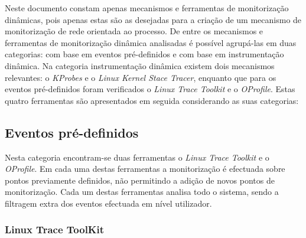 Neste documento constam apenas mecanismos e ferramentas de monitorização dinâmicas, pois apenas estas são as desejadas para a criação de um mecanismo de monitorização de rede orientada ao processo.
De entre os mecanismos e ferramentas de monitorização dinâmica analisadas é possível agrupá-las em duas categorias: com base em eventos pré-definidos e com base em instrumentação dinâmica.
Na categoria instrumentação dinâmica existem dois mecanismos relevantes: o \textit{KProbes} e o \textit{Linux Kernel Stace Tracer}, enquanto que para os eventos pré-definidos foram verificados o \textit{Linux Trace Toolkit} e o \textit{OProfile}.
Estas quatro ferramentas são apresentados em seguida considerando as suas categorias:

\subsection{Eventos pré-definidos}

Nesta categoria encontram-se duas ferramentas o \textit{Linux Trace Toolkit} e o \textit{OProfile}.
Em cada uma destas ferramentas a monitorização é efectuada sobre pontos previamente definidos, não permitindo a adição de novos pontos de monitorização.
Cada um destas ferramentas analisa todo o sistema, sendo a filtragem extra dos eventos efectuada em nível utilizador.

\subsubsection{Linux Trace ToolKit}\label{cap:linux_trace_toolkit_overview}


